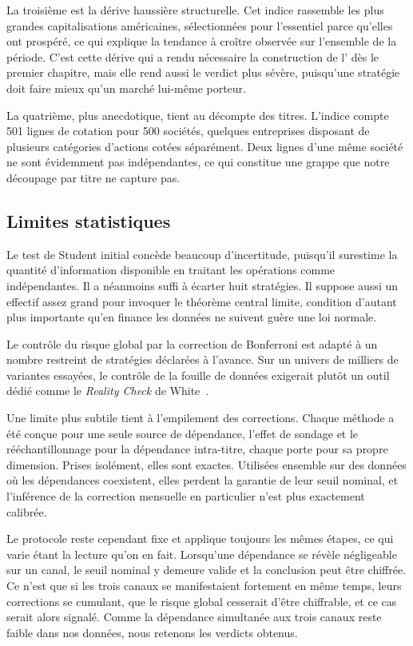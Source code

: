 La troisième est la dérive haussière structurelle. Cet indice rassemble les
plus grandes capitalisations américaines, sélectionnées pour l'essentiel parce
qu'elles ont prospéré, ce qui explique la tendance à croître observée sur
l'ensemble de la période. C'est cette dérive qui a rendu nécessaire la
construction de l'\edgevar{} dès le premier chapitre, mais elle rend aussi le
verdict plus sévère, puisqu'une stratégie doit faire mieux qu'un marché
lui-même porteur.

La quatrième, plus anecdotique, tient au décompte des titres. L'indice compte
501 lignes de cotation pour 500 sociétés, quelques entreprises disposant de
plusieurs catégories d'actions cotées séparément. Deux lignes d'une même
société ne sont évidemment pas indépendantes, ce qui constitue une grappe que
notre découpage par titre ne capture pas.

\subsection*{Limites statistiques}

Le test de Student initial concède beaucoup d'incertitude, puisqu'il surestime
la quantité d'information disponible en traitant les opérations comme
indépendantes. Il a néanmoins suffi à écarter huit stratégies. Il suppose
aussi un effectif assez grand pour invoquer le théorème central limite,
condition d'autant plus importante qu'en finance les données ne suivent guère
une loi normale.

Le contrôle du risque global par la correction de Bonferroni est adapté à un
nombre restreint de stratégies déclarées à l'avance. Sur un univers de milliers
de variantes essayées, le contrôle de la fouille de données exigerait plutôt un
outil dédié comme le \emph{Reality Check} de White~\cite{white2000}.

Une limite plus subtile tient à l'empilement des corrections. Chaque méthode a
été conçue pour une seule source de dépendance, l'effet de sondage et le
rééchantillonnage pour la dépendance intra-titre, chaque porte pour sa propre
dimension. Prises isolément, elles sont exactes. Utilisées ensemble sur des
données où les dépendances coexistent, elles perdent la garantie de leur seuil
nominal, et l'inférence de la correction mensuelle en particulier n'est plus
exactement calibrée.

Le protocole reste cependant fixe et applique toujours les mêmes étapes, ce
qui varie étant la lecture qu'on en fait. Lorsqu'une dépendance se révèle
négligeable sur un canal, le seuil nominal y demeure valide et la conclusion
peut être chiffrée. Ce n'est que si les trois canaux se manifestaient
fortement en même temps, leurs corrections se cumulant, que le risque global
cesserait d'être chiffrable, et ce cas serait alors signalé. Comme la
dépendance simultanée aux trois canaux reste faible dans nos données, nous
retenons les verdicts obtenus.

